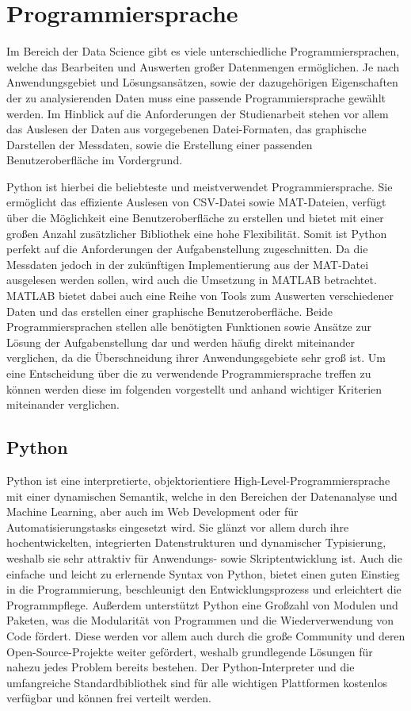 \section{Programmiersprache}

Im Bereich der Data Science gibt es viele unterschiedliche Programmiersprachen, welche das Bearbeiten und Auswerten großer Datenmengen ermöglichen. Je nach Anwendungsgebiet und Lösungsansätzen, sowie der dazugehörigen Eigenschaften der zu analysierenden Daten muss eine passende Programmiersprache gewählt werden. Im Hinblick auf die Anforderungen der Studienarbeit stehen vor allem das Auslesen der Daten aus vorgegebenen Datei-Formaten, das graphische Darstellen der Messdaten, sowie die Erstellung einer passenden Benutzeroberfläche im Vordergrund.\cite{dataSciLang}

Python ist hierbei die beliebteste und meistverwendet Programmiersprache.\cite{dataSciLang} Sie ermöglicht das effiziente Auslesen von CSV-Datei sowie MAT-Dateien, verfügt über die Möglichkeit eine Benutzeroberfläche zu erstellen und bietet mit einer großen Anzahl zusätzlicher Bibliothek eine hohe Flexibilität. Somit ist Python perfekt auf die Anforderungen der Aufgabenstellung zugeschnitten. Da die Messdaten jedoch in der zukünftigen Implementierung aus der MAT-Datei ausgelesen werden sollen, wird auch die Umsetzung in MATLAB betrachtet. MATLAB bietet dabei auch eine Reihe von Tools zum Auswerten verschiedener Daten und das erstellen einer graphische Benutzeroberfläche. Beide Programmiersprachen stellen alle benötigten Funktionen sowie Ansätze zur Lösung der Aufgabenstellung dar und werden häufig direkt miteinander verglichen, da die Überschneidung ihrer Anwendungsgebiete sehr groß ist. Um eine Entscheidung über die zu verwendende Programmiersprache treffen zu können werden diese im folgenden vorgestellt und anhand wichtiger Kriterien miteinander verglichen.

\subsection{Python}

Python ist eine interpretierte, objektorientiere High-Level-Programmiersprache mit einer dynamischen Semantik, welche in den Bereichen der Datenanalyse und Machine Learning, aber auch im Web Development oder für Automatisierungstasks eingesetzt wird. Sie glänzt vor allem durch ihre hochentwickelten, integrierten Datenstrukturen und dynamischer Typisierung, weshalb sie sehr attraktiv für Anwendungs- sowie Skriptentwicklung ist. Auch die einfache und leicht zu erlernende Syntax von Python, bietet einen guten Einstieg in die Programmierung, beschleunigt den Entwicklungsprozess und erleichtert die Programmpflege. Außerdem unterstützt Python eine Großzahl von Modulen und Paketen, was die Modularität von Programmen und die Wiederverwendung von Code fördert. Diese werden vor allem auch durch die große Community und deren Open-Source-Projekte weiter gefördert, weshalb grundlegende Lösungen für nahezu jedes Problem bereits bestehen. Der Python-Interpreter und die umfangreiche Standardbibliothek sind für alle wichtigen Plattformen kostenlos verfügbar und können frei verteilt werden.\cite{whatIsPython}\cite{pythonBeginners}

